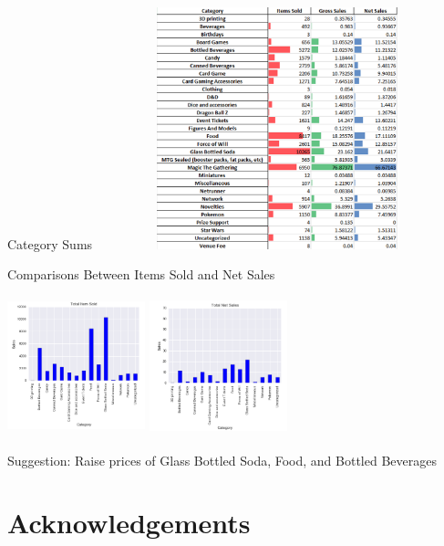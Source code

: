 \documentclass[compress,blue]{beamer}
\begin{document}
\begin{frame}{Category Sums}
\vspace{0cm}
\row{\textwidth}
\includegraphics[width=10.5cm,height=7cm]{CategorySums}
\end{frame}


\begin{frame}{Comparisons Between Items Sold and Net Sales}
\begin{rows}
\row{\textwidth}
\includegraphics[width=4cm,height=4cm]{TotalItemsSold}
\hspace{1cm}
\includegraphics[width=4cm,height=4cm]{TotalNetSales}
\end{rows}
\newline
Suggestion: Raise prices of Glass Bottled Soda, Food, and Bottled Beverages
\end{frame}



\section{Acknowledgements}
\end{document}
